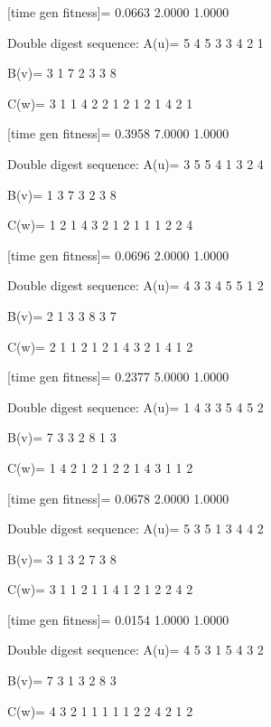 [time gen fitness]=
    0.0663    2.0000    1.0000

Double digest sequence:
A(u)=
     5     4     5     3     3     4     2     1

B(v)=
     3     1     7     2     3     3     8

C(w)=
     3     1     1     4     2     2     1     2     1     2     1     4     2     1

[time gen fitness]=
    0.3958    7.0000    1.0000

Double digest sequence:
A(u)=
     3     5     5     4     1     3     2     4

B(v)=
     1     3     7     3     2     3     8

C(w)=
     1     2     1     4     3     2     1     2     1     1     1     2     2     4

[time gen fitness]=
    0.0696    2.0000    1.0000

Double digest sequence:
A(u)=
     4     3     3     4     5     5     1     2

B(v)=
     2     1     3     3     8     3     7

C(w)=
     2     1     1     2     1     2     1     4     3     2     1     4     1     2

[time gen fitness]=
    0.2377    5.0000    1.0000

Double digest sequence:
A(u)=
     1     4     3     3     5     4     5     2

B(v)=
     7     3     3     2     8     1     3

C(w)=
     1     4     2     1     2     1     2     2     1     4     3     1     1     2

[time gen fitness]=
    0.0678    2.0000    1.0000

Double digest sequence:
A(u)=
     5     3     5     1     3     4     4     2

B(v)=
     3     1     3     2     7     3     8

C(w)=
     3     1     1     2     1     1     4     1     2     1     2     2     4     2

[time gen fitness]=
    0.0154    1.0000    1.0000

Double digest sequence:
A(u)=
     4     5     3     1     5     4     3     2

B(v)=
     7     3     1     3     2     8     3

C(w)=
     4     3     2     1     1     1     1     1     2     2     4     2     1     2

